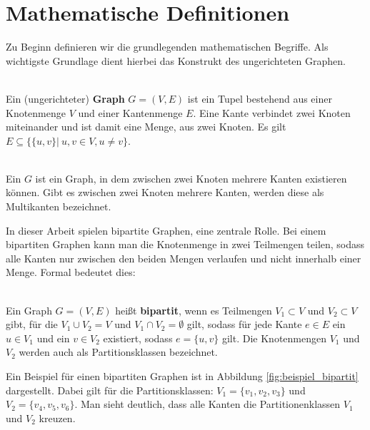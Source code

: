 



\section{Mathematische Definitionen}
Zu Beginn definieren wir die grundlegenden mathematischen Begriffe. Als wichtigste Grundlage dient 
hierbei das Konstrukt des ungerichteten Graphen.
\begin{definition}[Graph] ~\\
Ein (ungerichteter) \textbf{Graph} $G = (V,E)$ ist ein Tupel bestehend aus einer Knotenmenge $V$ und einer Kantenmenge
 $E$. Eine Kante verbindet zwei Knoten miteinander und ist damit eine Menge, aus zwei Knoten.
 Es gilt $E \subseteq \{ \{u,v\} |\ u,v \in V, u \neq v \}$.  
\end{definition}
\begin{definition}[Multigraph] ~\\
Ein  $G$ ist ein Graph, in dem zwischen zwei Knoten mehrere Kanten existieren 
können. Gibt es zwischen zwei Knoten mehrere Kanten, werden diese als Multikanten bezeichnet.
\end{definition}
\noindent
In dieser Arbeit spielen bipartite Graphen, eine zentrale Rolle.
Bei einem bipartiten Graphen kann man die Knotenmenge in zwei Teilmengen teilen, sodass alle Kanten nur zwischen den 
beiden Mengen verlaufen und nicht innerhalb einer Menge. Formal bedeutet dies:
\begin{definition} ~\\
Ein Graph $G=(V,E)$ heißt \textbf{bipartit}, wenn es Teilmengen $V_1 \subset V$ und $V_2 \subset V$ gibt, für die 
$V_1 \cup V_2 = V$ und $V_1 \cap V_2 = \emptyset$ gilt,
 sodass für jede Kante $e \in E$ ein $u \in V_1$ und ein $v \in V_2$ existiert, sodass $e = \{u,v\}$ gilt.
Die Knotenmengen $V_1$ und $V_2$ werden auch als Partitionsklassen bezeichnet.
\end{definition}

\noindent
Ein Beispiel für einen bipartiten Graphen ist in Abbildung \ref{fig:beispiel_bipartit} dargestellt. Dabei gilt für die Partitionsklassen:
$V_1 = \{v_1,v_2,v_3\}$ und $V_2 = \{v_{4},v_5,v_6\}$. Man sieht deutlich, dass alle Kanten die Partitionenklassen
$V_1$ und $V_2$ \glqq kreuzen\grqq.

